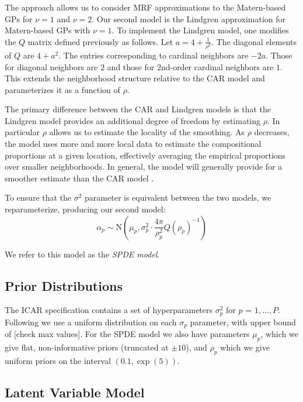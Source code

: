 \documentclass[12pt]{article}\usepackage[]{graphicx}\usepackage[]{color}
\begin{document}
The \citet{Lind:etal:2011} approach allows us to consider MRF approximations
to the Matern-based GPs for $\nu=1$ and $\nu=2$. Our second model
is the Lindgren approximation for Matern-based GPs with $\nu=1$.
To implement the Lindgren model, one modifies the $Q$ matrix defined
previously as follows. Let $a=4+\frac{1}{\rho^{2}}$. The diagonal
elements of $Q$ are $4+a^{2}$. The entries corresponding to cardinal
neighbors are $-2a$. Those for diagonal neighbors are $2$ and those
for 2nd-order cardinal neighbors are $1$. This extends the neighborhood
structure relative to the CAR model and parameterizes it as a function
of $\rho$.

The primary difference between the CAR and Lindgren models is that
the Lindgren model provides an additional degree of freedom by estimating
$\rho$. In particular $\rho$ allows us to estimate the locality
of the smoothing. As $\rho$ decreases, the model uses more and more
local data to estimate the compositional proportions at a given location,
effectively averaging the empirical proportions over smaller neighborhoods.
In general, the \cite{Lind:etal:2011} model will generally provide
for a smoother estimate than the CAR model \citep{Paci:2013}. 

To ensure that the $\sigma^{2}$ parameter is equivalent between the
two models, we reparameterize, producing our second model:
\[
\alpha_{p}\sim\mbox{N}(\mu_{p},\sigma_{p}^{2}\cdot\frac{4\pi}{\rho_{p}^{2}}Q(\rho_{p})^{-1})
\]


We refer to this model as the \emph{SPDE model}.


\subsection{Prior Distributions}

\noindent The ICAR specification contains a set of hyperparameters
$\sigma_{p}^{2}$ for $p$ = $1,...,P$. Following \citep{Gelm:2006}
we use a uniform distribution on each $\sigma_{p}$ parameter, with
upper bound of {[}check max values{]}. For the SPDE model we also
have parameters $\mu_{p}$, which we give flat, non-informative priors
(truncated at $\pm10$), and $\rho_{p}$ which we give uniform priors
on the interval $(0.1,\exp(5))$. 


\subsection{Latent Variable Model\label{sub:Latent-Variable-Model}}
\end{document}
